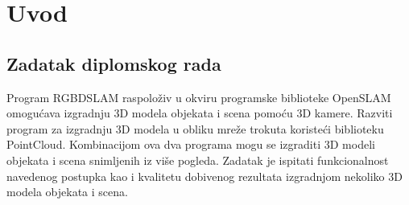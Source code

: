 \newpage

\setcounter{page}{1}
\setcounter{figure}{0}
\section{Uvod}%
\label{sec:Uvod}

\subsection{Zadatak diplomskog rada} %
\label{sub:Zadatak diplomskog rada}

Program RGBDSLAM raspoloživ u okviru programske biblioteke OpenSLAM
omogućava izgradnju 3D modela objekata i scena pomoću 3D kamere.
Razviti program za izgradnju 3D modela u obliku mreže trokuta koristeći
biblioteku PointCloud. Kombinacijom ova dva programa mogu se izgraditi
3D modeli objekata i scena snimljenih iz više pogleda. Zadatak je
ispitati funkcionalnost navedenog postupka kao i kvalitetu dobivenog
rezultata izgradnjom nekoliko 3D modela objekata i scena.

